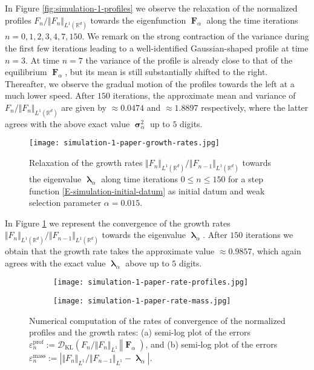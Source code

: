 \documentclass[reqno]{amsart}
\DeclareMathOperator{\blambda}{\boldsymbol{\lambda}}
\DeclareMathOperator{\bsigma}{\boldsymbol{\sigma}}
\DeclareMathOperator{\bF}{\boldsymbol{F}}
\numberwithin{equation}{section}
\begin{document}
{In Figure \ref{fig:simulation-1-profiles} we observe the relaxation of the normalized profiles $F_n/\Vert F_n\Vert_{L^1(\mathbb{R}^d)}$ towards the eigenfunction $\bF_\alpha$ along the time iterations $n=0,1,2,3,4,7,150$. We remark on the strong contraction of the variance during the first few iterations leading to a well-identified Gaussian-shaped profile at time $n=3$. At time $n=7$ the variance of the profile is already close to that of the equilibrium $\bF_\alpha$, but its mean is still substantially shifted to the right. Thereafter, we observe the gradual motion of the profiles towards the left at a much lower speed. After $150$ iterations, the approximate mean and variance of $F_n/\Vert F_n\Vert_{L^1(\mathbb{R}^d)}$ are given by $\approx 0.0474$ and $\approx 1.8897$ respectively, where the latter agrees with the above exact value $\bsigma_\alpha^2$ up to $5$ digits.

\begin{figure}
\centering
\texttt{[image: simulation-1-paper-growth-rates.jpg]}
\caption{Relaxation of the growth rates $\Vert F_n\Vert_{L^1(\mathbb{R}^d)}/\Vert F_{n-1}\Vert_{L^1(\mathbb{R}^d)}$ towards the eigenvalue $\blambda_\alpha$ along time iterations $0\leq n\leq 150$ for a step function \eqref{E-simulation-initial-datum} as initial datum and weak selection parameter $\alpha=0.015$.}
\label{fig:simulation-1-rates-growth}
\end{figure}

In Figure \ref{fig:simulation-1-rates-growth} we represent the convergence of the growth rates $\Vert F_n\Vert_{L^1(\mathbb{R}^d)}/\Vert F_{n-1}\Vert_{L^1(\mathbb{R}^d)}$ towards the eigenvalue $\blambda_\alpha$. After $150$ iterations we obtain that the growth rate takes the approximate value $\approx 0.9857$, which again agrees with the exact value $\blambda_\alpha$ above up to $5$ digits.

\begin{figure}
\centering
\begin{subfigure}[t]{0.49\textwidth}
\centering
\texttt{[image: simulation-1-paper-rate-profiles.jpg]}
\caption{ }
\label{fig:simulation-1-rates-profiles}
\end{subfigure}
\begin{subfigure}[t]{0.49\textwidth}
\centering
\texttt{[image: simulation-1-paper-rate-mass.jpg]}
\caption{ }
\label{fig:simulation-1-rates-mass}
\end{subfigure}
\caption{Numerical computation of the rates of convergence of  the normalized profiles and the growth rates: (a)  semi-log plot of the errors $\varepsilon_n^{\text{prof}}:=\mathcal{D}_{\text{KL}}\left(\left.F_n/\Vert F_n\Vert_{L^1}\,\right\Vert \bF_\alpha\right)$, and (b) semi-log plot of the errors $\varepsilon_n^{\text{mass}}:=\left\vert \Vert F_n\Vert_{L^1}/\Vert F_{n-1}\Vert_{L^1}-\blambda_\alpha\right\vert$.}
\label{fig:simulation-1-rates}
\end{figure}

}
\end{document}
